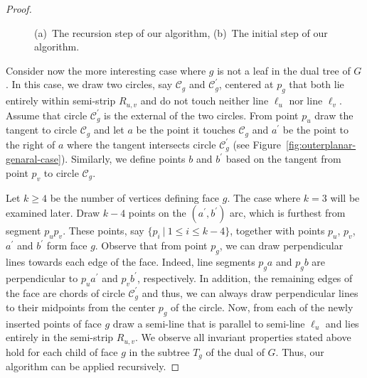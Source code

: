 \documentclass{llncs}
\begin{document}
\begin{proof}
\begin{figure}[h!tb]
  \centering
  \begin{minipage}[b]{.68\textwidth}
     \centering
  \end{minipage}
  \hfill
  \begin{minipage}[b]{.31\textwidth}
     \centering
  \end{minipage}
  \caption{(a)~The recursion step of our algorithm, (b)~The initial step of our algorithm.}
  \label{fig:ata-graph}
\end{figure}

Consider now the more interesting case where $g$ is not a leaf in
the dual tree of $G$. In this case, we draw two circles, say
$\mathcal{C}_g$ and $\mathcal{C}^{\prime}_g$, centered at $p_g$ that
both lie entirely within semi-strip $R_{u,v}$ and do not touch
neither line $\ell_u$ nor line $\ell_v$. Assume that circle
$\mathcal{C}^{\prime}_g$ is the external of the two circles. From
point $p_u$ draw the tangent to circle $\mathcal{C}_g$ and let $a$
be the point it touches $\mathcal{C}_g$ and $a^{\prime}$ be the
point to the right of $a$ where the tangent intersects circle
$\mathcal{C}^{\prime}_g$ (see
Figure~\ref{fig:outerplanar-genaral-case}). Similarly, we define
points $b$ and $b^{\prime}$ based on the tangent from point $p_v$ to
circle $\mathcal{C}_g$.

Let $k \geq 4$ be the number of vertices defining face $g$. The case
where $k=3$ will be examined later. Draw $k-4$ points on the
$(a^{\prime},b^{\prime})$ arc, which is furthest from segment
$p_up_v$. These points, say $\{p_i~|~1\leq i \leq k-4\}$, together
with points $p_u$, $p_v$, $a^\prime$ and $b^\prime$ form face $g$.
Observe that from point $p_g$, we can draw perpendicular lines
towards each edge of the face. Indeed, line segments $p_ga$ and
$p_gb$ are perpendicular to $p_ua^\prime$ and $p_vb^\prime$,
respectively. In addition, the remaining edges of the face are
chords of circle $\mathcal{C}^\prime_g$ and thus, we can always draw
perpendicular lines to their midpoints from the center $p_g$ of the
circle. Now, from each of the newly inserted points of face $g$ draw
a semi-line that is parallel to semi-line $\ell_u$ and lies entirely
in the semi-strip $R_{u,v}$. We observe all invariant properties
stated above hold for each child of face $g$ in the subtree $T_g$ of
the dual of $G$. Thus, our algorithm can be applied recursively.


\end{proof}
\end{document}
